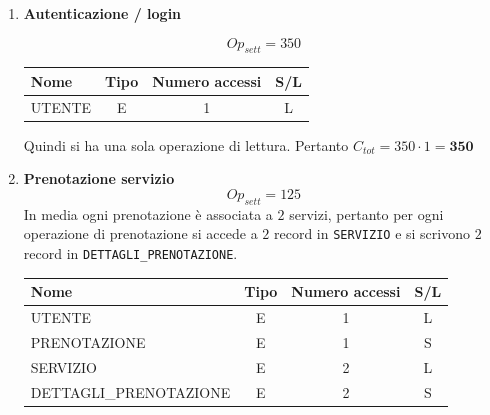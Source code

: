 \documentclass[a4paper,12pt]{report}
\begin{document}
\begin{enumerate}
	\item {\large \textbf{Autenticazione / login}} \label{op2}

	      $$
		      {Op}_{sett} = 350
	      $$

	      \begin{table}[H]
		      \centering
		      \small
		      \renewcommand{\arraystretch}{1.15}
		      \begin{tabularx}{0.8\textwidth}{|X|c|c|c|}
			      \hline
			      \rowcolor{gray!20}
			      \textbf{Nome} & \textbf{Tipo} & \textbf{Numero accessi} & \textbf{S/L} \\
			      \hline
			      UTENTE        & E             & 1                       & L            \\
			      \hline
		      \end{tabularx}
	      \end{table}

	      Quindi si ha una sola operazione di lettura.
	      Pertanto $C_{tot} = 350 \cdot 1 = \mathbf{350}$

	\item {\large \textbf{Prenotazione servizio}} \label{op3}
	      $$
		      {Op}_{sett}=125
	      $$
	      In media ogni prenotazione è associata a $2$ servizi,
	      pertanto per ogni operazione di prenotazione si accede a $2$ record in \texttt{SERVIZIO}
	      e si scrivono $2$ record in \texttt{DETTAGLI\_PRENOTAZIONE}.

	      \begin{table}[H]
		      \centering
		      \small
		      \renewcommand{\arraystretch}{1.15}
		      \begin{tabularx}{0.8\textwidth}{|X|c|c|c|}
			      \hline
			      \rowcolor{gray!20}
			      \textbf{Nome}          & \textbf{Tipo} & \textbf{Numero accessi} & \textbf{S/L} \\
			      \hline
			      UTENTE                 & E             & 1                       & L            \\
			      PRENOTAZIONE           & E             & 1                       & S            \\
			      SERVIZIO               & E             & 2                       & L            \\
			      DETTAGLI\_PRENOTAZIONE & E             & 2                       & S            \\
			      \hline
		      \end{tabularx}
	      \end{table}


\end{enumerate}
\end{document}
